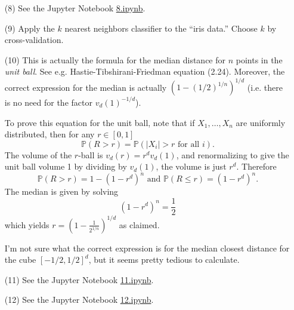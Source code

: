 \documentclass[10pt]{article}
\renewcommand{\P}{\mathbb{P}}
\begin{document}
\begin{enumerate}
\item[(8)] See the Jupyter Notebook
\href{https://github.com/ajrasmus/some_of_statistics/blob/main/chapter_22/8.ipynb}{8.ipynb}.

\item[(9)] Apply the $k$ nearest neighbors classifier to the ``iris data.''
Choose $k$ by cross-validation.

\item[(10)]
This is actually the formula for the median distance for $n$ points in the
\emph{unit ball}. See e.g. Hastie-Tibshirani-Friedman equation (2.24). Moreover,
the correct expression for the median is actually $(1 - (1/2)^{1/n})^{1/d}$ (i.e.
there is no need for the factor $v_d(1)^{-1/d}$).

To prove this equation for the unit ball, note that if $X_1,\ldots,X_n$
are uniformly distributed, then for any $r \in [0,1]$
\[
    \P(R>r) = \P(|X_i| > r \text{ for all } i).
\]
The volume of the $r$-ball is $v_d(r)=r^d v_d(1)$, and renormalizing to give
the unit ball volume 1 by dividing by $v_d(1)$, the volume is just $r^d$.
Therefore
\[
    \P(R>r) = 1 - (1-r^d)^n \text{ and } \P(R \leq r) = (1-r^d)^n.
\]
The median is given by solving
\[
    (1-r^d)^n = \frac{1}{2}
\]
which yields $r=\left(1-\frac{1}{2^{1/n}}\right)^{1/d}$ as claimed.

I'm not sure what the correct expression is for the median closest distance
for the cube $[-1/2,1/2]^d$, but it seems pretty tedious to calculate.

\item[(11)]
See the Jupyter Notebook
\href{https://github.com/ajrasmus/some_of_statistics/blob/main/chapter_22/11.ipynb}{11.ipynb}.

\item[(12)] See the Jupyter Notebook
\href{https://github.com/ajrasmus/some_of_statistics/blob/main/chapter_22/12.ipynb}{12.ipynb}.
\end{enumerate}
\end{document}
